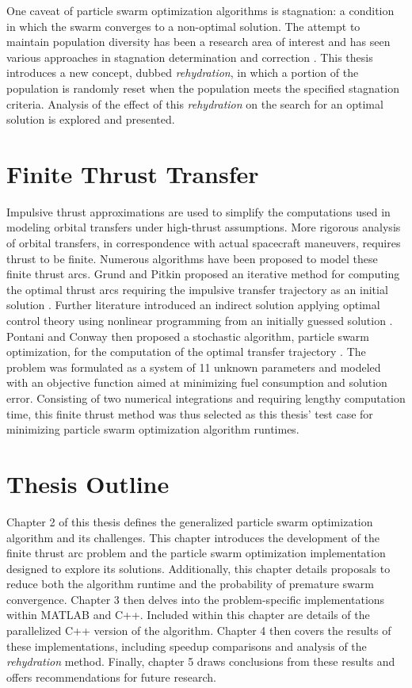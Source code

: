 \noindent One caveat of particle swarm optimization algorithms is stagnation: a condition in which the swarm converges to a non-optimal solution. The attempt to maintain population 
diversity has been a research area of interest and has seen various approaches in stagnation determination and correction \citep{PSOstag1, PSOstag2}. This thesis introduces a new concept,
dubbed \textit{rehydration}, in which a portion of the population is randomly reset when the population meets the specified stagnation criteria. Analysis of the effect of this
\textit{rehydration} on the search for an optimal solution is explored and presented.

\section{Finite Thrust Transfer}

\noindent Impulsive thrust approximations are used to simplify the computations used in modeling orbital transfers under high-thrust assumptions.
More rigorous analysis of orbital transfers, in correspondence with actual spacecraft maneuvers, requires thrust to be finite. Numerous algorithms have been
proposed to model these finite thrust arcs. Grund and Pitkin proposed an iterative method for computing the optimal thrust arcs requiring the impulsive transfer trajectory as
an initial solution \citep{Fthrust1}. Further literature introduced an indirect solution applying optimal control theory using nonlinear programming from an initially guessed
solution \citep{Fthrust2}. Pontani and Conway then proposed a stochastic algorithm, particle swarm optimization, for the computation of the optimal transfer trajectory \citep{Pontani_Conway}. The problem was formulated as 
a system of 11 unknown parameters and modeled with an objective function aimed at minimizing fuel consumption
and solution error. Consisting of two numerical integrations and requiring lengthy computation time, this finite thrust 
method was thus selected as this thesis' test case for minimizing particle swarm optimization algorithm runtimes.


\section{Thesis Outline}

\noindent Chapter 2 of this thesis defines the generalized particle swarm optimization algorithm and its challenges. This chapter introduces the development of the finite thrust arc problem
and the particle swarm optimization implementation designed to explore its solutions. Additionally, this chapter 
details proposals to reduce both the algorithm runtime and the probability of premature swarm convergence.
Chapter 3 then delves into the problem-specific implementations within MATLAB and C++. Included within
this chapter are details of the parallelized C++ version of the algorithm. 
Chapter 4 then covers the results of these implementations, including speedup comparisons and analysis of the \textit{rehydration} method.
Finally, chapter 5 draws conclusions from these results and offers recommendations for future research. 